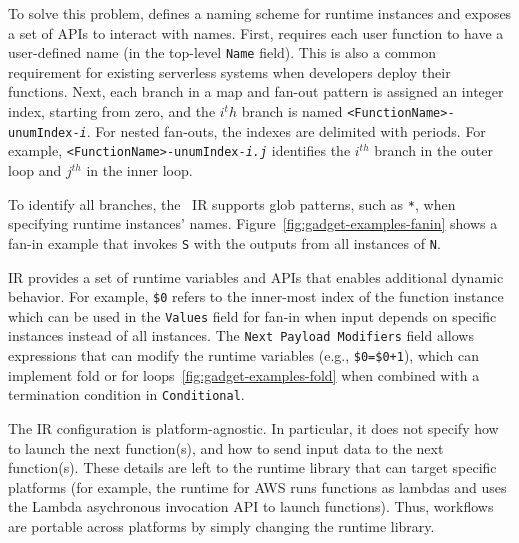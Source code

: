 To solve this problem, \name{} defines a naming scheme for runtime instances
and exposes a set of APIs to interact with names. First,
\name{} requires each user function to have a user-defined name (in the
top-level \texttt{Name} field). This is also a common requirement for existing
serverless systems when developers deploy their functions. Next, each branch
in a map and fan-out pattern is assigned an integer index,
starting from zero, and the $i^th$ branch is named
\texttt{<FunctionName>-unumIndex-\emph{i}}. For nested fan-outs, the indexes
are delimited with periods. For example,
\texttt{<FunctionName>-unumIndex-\emph{i.j}} identifies the $i^{th}$ branch in
the outer loop and $j^{th}$ in the inner loop.

To identify all branches, the \name{}~IR supports glob patterns, such as
\texttt{*}, when specifying runtime instances' names.
Figure~\ref{fig:gadget-examples-fanin} shows a fan-in example that invokes
\texttt{S} with the outputs from all instances of \texttt{N}.

\name{} IR provides a set of runtime variables and APIs that enables
additional dynamic behavior. For example, \texttt{\$0} refers to the
inner-most index of the function instance which can be used in the
\texttt{Values} field for fan-in when input depends on specific instances
instead of all instances. The \texttt{Next Payload Modifiers} field allows
expressions that can modify the runtime variables (e.g., \texttt{\$0=\$0+1}),
which can implement fold or for loops~\ref{fig:gadget-examples-fold} when
combined with a termination condition in \texttt{Conditional}.

The IR configuration is platform-agnostic. In particular, it does not specify
how to launch the next function(s), and how to send input data to the next
function(s). These details are left to the \name{} runtime library that can
target specific platforms (for example, the runtime for AWS runs functions as
lambdas and uses the Lambda asychronous invocation API to launch functions).
Thus, workflows are portable across platforms by simply changing the runtime
library.



